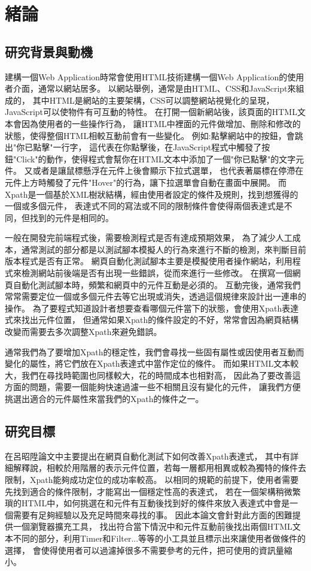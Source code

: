 \chapter{緒論}
\section{研究背景與動機}
\indent
建構一個Web Application時常會使用HTML技術建構一個Web Application的使用者介面，通常以網站居多。
以網站舉例，通常是由HTML、CSS和JavaScript來組成的，
其中HTML是網站的主要架構，CSS可以調整網站視覺化的呈現，JavaScript可以使物件有可互動的特性。
在打開一個新網站後，該頁面的HTML文本會因為使用者的一些操作行為，
讓HTML中裡面的元件做增加、刪除和修改的狀態，使得整個HTML相較互動前會有一些變化。
例如:點擊網站中的按鈕，會跳出"你已點擊"一行字，
這代表在你點擊後，在JavaScript程式中觸發了按鈕"Click"的動作，使得程式會幫你在HTML文本中添加了一個"你已點擊"的文字元件。
又或者是讓鼠標懸浮在元件上後會顯示下拉式選單，
也代表著屬標在停滯在元件上方時觸發了元件"Hover"的行為，讓下拉選單會自動在畫面中展開。
而Xpath是一個基於XML樹狀結構，經由使用者設定的條件及規則，找到想獲得的一個或多個元件，
表達式不同的寫法或不同的限制條件會使得兩個表達式是不同，但找到的元件是相同的。

\indent
一般在開發完前端程式後，需要檢測程式是否有達成預期效果，
為了減少人工成本，通常測試的部分都是以測試腳本模擬人的行為來進行不斷的檢測，來判斷目前版本程式是否有正常。
網頁自動化測試腳本主要是模擬使用者操作網站，利用程式來檢測網站前後端是否有出現一些錯誤，從而來進行一些修改。
在撰寫一個網頁自動化測試腳本時，頻繁和網頁中的元件互動是必須的。
互動完後，通常我們常常需要定位一個或多個元件去等它出現或消失，透過這個規律來設計出一連串的操作。
為了要程式知道設計者想要查看哪個元件當下的狀態，會使用Xpath表達式來找出元件位置，
但通常如果Xpath的條件設定的不好，常常會因為網頁結構改變而需要去多次調整Xpath來避免錯誤。

\indent
通常我們為了要增加Xpath的穩定性，我們會尋找一些固有屬性或因使用者互動而變化的屬性，將它們放在Xpath表達式中當作定位的條件。
而如果HTML文本較大，我們在尋找時範圍也同樣較大，花的時間成本也相對高，
因此為了要改善這方面的問題，需要一個能夠快速過濾一些不相關且沒有變化的元件，
讓我們方便挑選出適合的元件屬性來當我們的Xpath的條件之一。

\section{研究目標}
\indent
在呂昭陞論文\cite{LIU-Thesis}中主要提出在網頁自動化測試下如何改善Xpath表達式，
其中有詳細解釋說，相較於用階層的表示元件位置，若每一層都用相異或較為獨特的條件去限制，Xpath能夠成功定位的成功率較高。
以相同的規範的前提下，使用者需要先找到適合的條件限制，才能寫出一個穩定性高的表達式，
若在一個架構稍微繁瑣的HTML中，如何挑選在和元件有互動後找到好的條件來放入表達式中會是一個需要有足夠經驗以及充足時間來尋找的事。
因此本論文會針對此方面的困難提供一個瀏覽器擴充工具，
找出符合當下情況中和元件互動前後找出兩個HTML文本不同的部分，利用Timer和Filter...等等的小工具並且標示出來讓使用者做條件的選擇，
會使得使用者可以過濾掉很多不需要參考的元件，把可使用的資訊量縮小。

